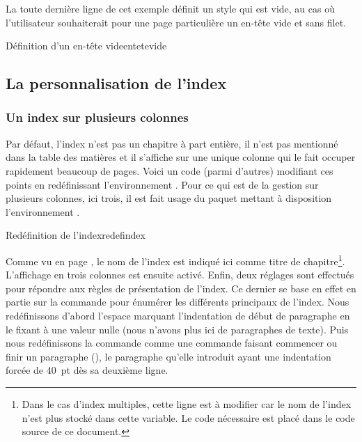 La toute dernière ligne de cet exemple définit un style \og {} \fg qui est vide, au cas où l'utilisateur souhaiterait pour une page particulière un en-tête vide et sans filet.

\begin{codesimple}{Définition d'un en-tête vide}{entetevide}
\end{codesimple}


\subsection{La personnalisation de l'index} 
\label{persoindex}

\subsubsection{Un index sur plusieurs colonnes}
\label{multicol}
Par défaut, l'index n'est pas un chapitre à part entière, il n'est pas mentionné dans la table des matières et il s'affiche sur une unique colonne qui le fait occuper rapidement beaucoup de pages. Voici un code (parmi d'autres) modifiant ces points en redéfinissant l'environnement . Pour ce qui est de la gestion sur plusieurs colonnes, ici trois, il est fait usage du paquet  mettant à disposition l'environnement .

\begin{codesimple}{Redéfinition de l'index}{redefindex}
\renewenvironment{theindex}{%
  \chapter{\indexname}%
  \begin{multicols}{3}%
  \setlength\parindent{0pt} %
  \newcommand\item{\par\hangindent=40pt}}%
{\end{multicols}}
\end{codesimple}


Comme vu en page \pageref{variabletexte}, le nom de l'index est indiqué ici comme titre de chapitre\footnote{Dans le cas d'index multiples, cette ligne est à modifier car le nom de l'index n'est plus stocké dans cette variable. Le code nécessaire est placé dans le code source de ce document.}. L'affichage en trois colonnes est ensuite activé. Enfin, deux réglages sont effectués pour répondre aux règles de présentation de l'index. Ce dernier se base en effet en partie sur la commande  pour énumérer les différents principaux de l'index. Nous redéfinissons d'abord l'espace marquant l'indentation de début de paragraphe en le fixant à une valeur nulle (nous n'avons plus ici de paragraphes de texte). Puis nous redéfinissons la  commande  comme une commande faisant commencer ou finir un paragraphe (), le paragraphe qu'elle introduit ayant une indentation forcée de 40~pt dès sa deuxième ligne.

